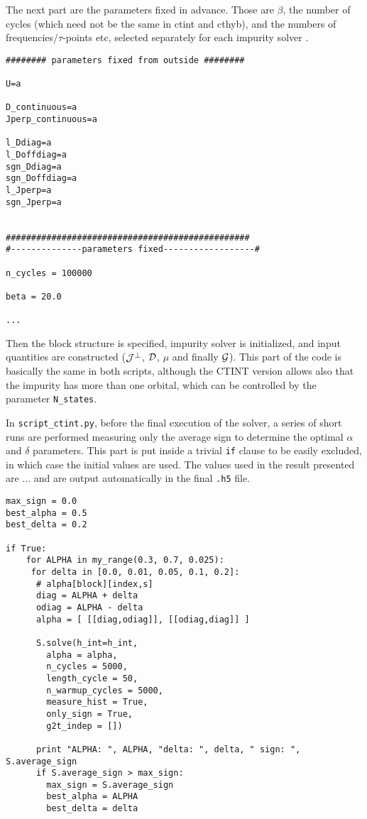 \documentclass[a4paper,10pt]{article}
\begin{document}
The next part are the parameters fixed in advance. Those are $\beta$, the number of cycles (which need not be the same in ctint and cthyb), and the numbers of frequencies/$\tau$-points etc, selected separately for each impurity solver .

\begin{lstlisting}
######## parameters fixed from outside ########

U=a

D_continuous=a
Jperp_continuous=a

l_Ddiag=a
l_Doffdiag=a
sgn_Ddiag=a
sgn_Doffdiag=a
l_Jperp=a
sgn_Jperp=a


################################################
#--------------parameters fixed------------------#

n_cycles = 100000

beta = 20.0

...
\end{lstlisting}
Then the block structure is specified, impurity solver is initialized, and input quantities are constructed (${\cal J}^\perp$, ${\cal D}$, $\mu$ and finally ${\cal G}$). This part of the code is basically the same in both scripts, although the CTINT version allows also that the impurity has more than one orbital, which can be controlled by the parameter {\tt N\_states}.

In {\tt script\_ctint.py}, before the final execution of the solver, a series of short runs are performed measuring only the average sign to determine the optimal $\alpha$ and $\delta$ parameters. This part is put inside a trivial {\tt if} clause to be easily excluded, in which case the initial values are used. The values used in the result presented are ... and are output automatically in the final {\tt .h5} file.

\begin{lstlisting}
max_sign = 0.0
best_alpha = 0.5
best_delta = 0.2

if True:
	for ALPHA in my_range(0.3, 0.7, 0.025):
	 for delta in [0.0, 0.01, 0.05, 0.1, 0.2]:
	  # alpha[block][index,s]
	  diag = ALPHA + delta
	  odiag = ALPHA - delta
	  alpha = [ [[diag,odiag]], [[odiag,diag]] ]

	  S.solve(h_int=h_int,
		alpha = alpha,
		n_cycles = 5000,
		length_cycle = 50,
		n_warmup_cycles = 5000,
		measure_hist = True,
		only_sign = True,
		g2t_indep = [])

	  print "ALPHA: ", ALPHA, "delta: ", delta, " sign: ", S.average_sign
	  if S.average_sign > max_sign:
	    max_sign = S.average_sign
	    best_alpha = ALPHA
	    best_delta = delta
\end{lstlisting}
\end{document}
